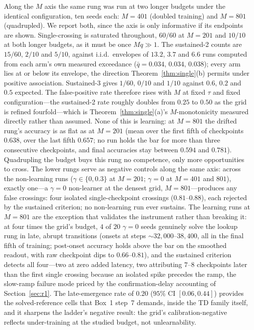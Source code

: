 \documentclass[11pt]{article}
\theoremstyle{plain}
\theoremstyle{definition}
\begin{document}
Along the $M$ axis the same rung was run at two longer budgets under the identical
configuration, ten seeds each: $M=401$ (doubled training) and $M=801$ (quadrupled). We
report both, since the axis is only informative if its endpoints are shown. Single-crossing
is saturated throughout, $60/60$ at $M=201$ and $10/10$ at both longer budgets, as it must
be once $Mq\gg1$. The sustained-2 counts are $15/60$, $2/10$ and $5/10$, against i.i.d.\
envelopes of $13.2$, $3.7$ and $6.6$ runs computed from each arm's own measured exceedance
($\bar q=0.034$, $0.034$, $0.038$); every arm lies at or below its envelope, the direction
Theorem~\ref{thm:single}(b) permits under positive association. Sustained-3 gives $1/60$,
$0/10$ and $1/10$ against $0.6$, $0.2$ and $0.5$ expected. The false-positive rate
therefore rises with $M$ at fixed $\tau$ and fixed configuration---the sustained-2 rate
roughly doubles from $0.25$ to $0.50$ as the grid is refined fourfold---which is
Theorem~\ref{thm:single}(a)'s $M$-monotonicity measured directly rather than assumed. None
of this is learning: at $M=801$ the drifted rung's accuracy is as flat as at $M=201$ (mean
over the first fifth of checkpoints $0.638$, over the last fifth $0.657$; no run holds the
bar for more than three consecutive checkpoints, and final accuracies stay between $0.594$
and $0.781$). Quadrupling the budget buys this rung no competence, only more opportunities
to cross. The lower rungs serve
as negative controls along the same axis: across the non-learning runs
($\gamma\in\{0,0.3\}$ at $M=201$; $\gamma=0$ at $M=401$ and $801$), exactly one---a
$\gamma=0$ non-learner at the densest grid, $M=801$---produces any false crossings:
four isolated single-checkpoint crossings ($0.81$--$0.88$), each rejected by the
sustained criterion; no non-learning run ever sustains. The learning runs at $M=801$
are the exception that validates
the instrument rather than breaking it: at four times the grid's budget, $4$ of $20$
$\gamma=0$ seeds genuinely solve the lookup rung in late, abrupt transitions (onsets at
steps ${\sim}32{,}000$--$38{,}400$, all in the final fifth of training; post-onset
accuracy holds above the bar on the smoothed readout, with raw checkpoint dips to
$0.66$--$0.81$), and the sustained criterion detects all four---two at zero added
latency, two attributing $7$--$8$ checkpoints later than the first single crossing
because an isolated spike precedes the ramp, the slow-ramp failure mode priced by the
confirmation-delay accounting of Section~\ref{sec:r1}. The late-emergence rate
of $0.20$ ($95\%$ CI $[0.06,0.44]$) provides the solved-reference cells that Box~1
step~7 demands, inside the TD family itself, and it sharpens the ladder's negative
result: the grid's calibration-negative reflects under-training at the studied budget,
not unlearnability.
\end{document}

